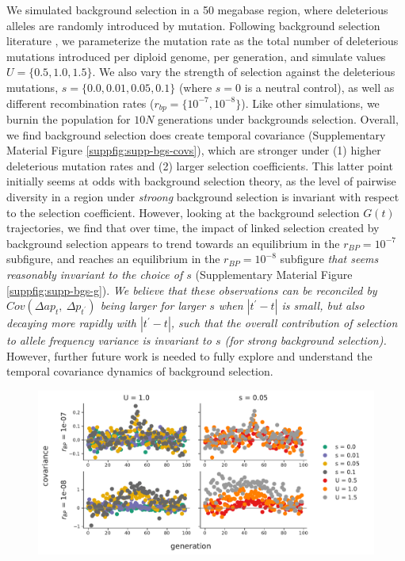 \documentclass[11pt]{article}
\newcommand{\gc}[1]{{\it \color{red} #1 } }
\begin{document}
{We simulated background selection in a 50 megabase region, where deleterious
alleles are randomly introduced by mutation. Following background selection
literature
\parencite{Charlesworth1993-gb,Nordborg1996-nq,Hudson1994-oh,Hudson1995-xc}, we
parameterize the mutation rate as the total number of deleterious mutations
introduced per diploid genome, per generation, and simulate values $U = \{0.5,
1.0, 1.5\}$. We also vary the strength of selection against the deleterious
mutations, $s = \{0.0, 0.01, 0.05, 0.1\}$ (where $s=0$ is a neutral control),
as well as different recombination rates ($r_{bp} = \{10^{-7}, 10^{-8}\}$).
Like other simulations, we burnin the population for $10N$ generations under
backgrounds selection. Overall, we find background selection does create
temporal covariance (Supplementary Material Figure
\ref{suppfig:supp-bgs-covs}), which are stronger under (1) higher deleterious
mutation rates and (2) larger selection coefficients. This latter point
initially seems at odds with background selection theory, as the level of
pairwise diversity in a region under \gc{stroong} background selection is invariant with
respect to the selection coefficient. However, looking at the background
selection $G(t)$ trajectories, we find that over time, the impact of linked
selection created by background selection appears to trend towards an
equilibrium in the $r_{BP} = 10^{-7}$ subfigure, and reaches an equilibrium in
the $r_{BP} = 10^{-8}$ subfigure \gc{that seems reasonably invariant
  to the choice of $s$} (Supplementary Material Figure
\ref{suppfig:supp-bgs-g}). \gc{We believe that these observations can
  be reconciled by $Cov(\Delta ap_t,~ \Delta p_{t^{\prime}})$ being larger for larger
  $s$ when $|t^{\prime}-t|$ is small, but also decaying more rapidly
  with $|t^{\prime}-t|$, such that the overall contribution of selection to allele frequency variance is invariant to $s$ (for strong background selection).} However, further future work is needed to fully
explore and understand the temporal covariance dynamics of background
selection.


\begin{figure}[!ht]
  \centering
  \includegraphics[width=\textwidth]{figures/fig-bgs-covars-without-fixations.pdf}


\end{figure}}
\end{document}

